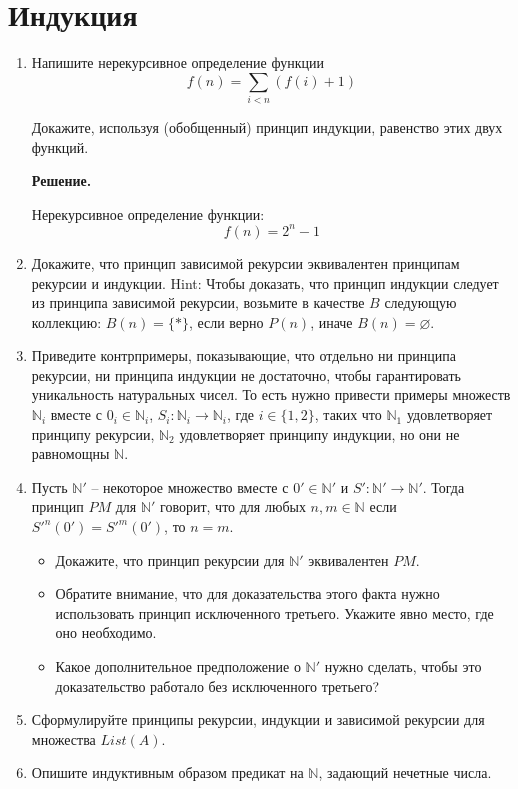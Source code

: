 \section*{Индукция}
\begin{enumerate}

\item Напишите нерекурсивное определение функции
\[ f(n) = \sum_{i < n} (f(i) + 1) \]

Докажите, используя (обобщенный) принцип индукции, равенство этих двух функций.

\textbf{Решение.} 

Нерекурсивное определение функции: 
\begin{equation*}
f(n) = 2^n - 1
\end{equation*}


\item Докажите, что принцип зависимой рекурсии эквивалентен принципам рекурсии и индукции.
    Hint: Чтобы доказать, что принцип индукции следует из принципа зависимой рекурсии, возьмите 
    в качестве $B$ следующую коллекцию:
    $B(n) = \{ * \}$, если верно $P(n)$, иначе $B(n) = \varnothing$.

\item Приведите контрпримеры, показывающие, что отдельно ни принципа рекурсии, ни принципа 
индукции не достаточно, чтобы гарантировать уникальность натуральных чисел.
    То есть нужно привести примеры множеств $\mathbb{N}_i$ вместе с $0_i \in \mathbb{N}_i$, $S_i 
    : \mathbb{N}_i \to \mathbb{N}_i$, где $i \in \{ 1, 2 \}$,
    таких что $\mathbb{N}_1$ удовлетворяет принципу рекурсии, $\mathbb{N}_2$ удовлетворяет 
    принципу индукции, но они не равномощны $\mathbb{N}$.

\item Пусть $\mathbb{N}'$ -- некоторое множество вместе с $0' \in \mathbb{N}'$ и $S' : 
\mathbb{N}' \to \mathbb{N}'$.
    Тогда принцип $PM$ для $\mathbb{N}'$ говорит, что для любых $n,m \in \mathbb{N}$ если 
    $S'^n(0') = S'^m(0')$, то $n = m$.
\begin{itemize}
\item Докажите, что принцип рекурсии для $\mathbb{N}'$ эквивалентен $PM$.
\item Обратите внимание, что для доказательства этого факта нужно использовать принцип 
исключенного третьего. Укажите явно место, где оно необходимо.
\item Какое дополнительное предположение о $\mathbb{N}'$ нужно сделать, чтобы это доказательство 
работало без исключенного третьего?
\end{itemize}

\item Сформулируйте принципы рекурсии, индукции и зависимой рекурсии для множества $List(A)$.

\item Опишите индуктивным образом предикат на $\mathbb{N}$, задающий нечетные числа.

\end{enumerate}

